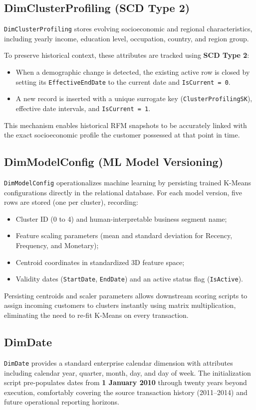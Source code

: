 \subsection{DimClusterProfiling (SCD Type 2)}
\texttt{DimClusterProfiling} stores evolving socioeconomic and regional characteristics, including yearly income, education level, occupation, country, and region group.

To preserve historical context, these attributes are tracked using \textbf{SCD Type 2}:
\begin{itemize}
    \item When a demographic change is detected, the existing active row is closed by setting its \texttt{EffectiveEndDate} to the current date and \texttt{IsCurrent = 0}.
    \item A new record is inserted with a unique surrogate key (\texttt{ClusterProfilingSK}), effective date intervals, and \texttt{IsCurrent = 1}.
\end{itemize}
This mechanism enables historical RFM snapshots to be accurately linked with the exact socioeconomic profile the customer possessed at that point in time.

\subsection{DimModelConfig (ML Model Versioning)}
\texttt{DimModelConfig} operationalizes machine learning by persisting trained K-Means configurations directly in the relational database. For each model version, five rows are stored (one per cluster), recording:
\begin{itemize}
    \item Cluster ID (0 to 4) and human-interpretable business segment name;
    \item Feature scaling parameters (mean and standard deviation for Recency, Frequency, and Monetary);
    \item Centroid coordinates in standardized 3D feature space;
    \item Validity dates (\texttt{StartDate}, \texttt{EndDate}) and an active status flag (\texttt{IsActive}).
\end{itemize}
Persisting centroids and scaler parameters allows downstream scoring scripts to assign incoming customers to clusters instantly using matrix multiplication, eliminating the need to re-fit K-Means on every transaction.

\subsection{DimDate}
\texttt{DimDate} provides a standard enterprise calendar dimension with attributes including calendar year, quarter, month, day, and day of week. The initialization script pre-populates dates from \textbf{1 January 2010} through twenty years beyond execution, comfortably covering the source transaction history (2011--2014) and future operational reporting horizons.

